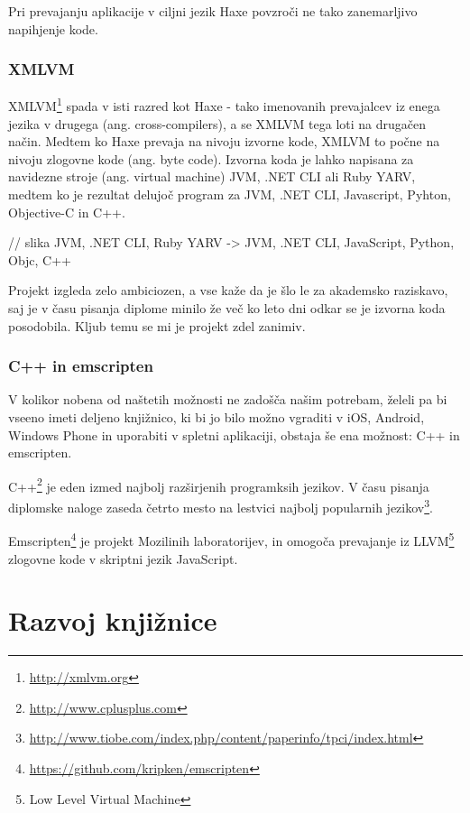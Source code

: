 Pri prevajanju aplikacije v ciljni jezik Haxe povzroči ne tako zanemarljivo napihjenje kode.

\subsection{XMLVM}

XMLVM\footnote{\href{http://xmlvm.org}{http://xmlvm.org}} spada v isti razred kot Haxe - tako imenovanih prevajalcev iz enega jezika v drugega (ang. cross-compilers), a se XMLVM tega loti na drugačen način. Medtem ko Haxe prevaja na nivoju izvorne kode, XMLVM to počne na nivoju zlogovne kode (ang. byte code). Izvorna koda je lahko napisana za navidezne stroje (ang. virtual machine) JVM, .NET CLI ali Ruby YARV, medtem ko je rezultat delujoč program za JVM, .NET CLI, Javascript, Pyhton, Objective-C in C++.

// slika JVM, .NET CLI, Ruby YARV -> JVM, .NET CLI, JavaScript, Python, Objc, C++

Projekt izgleda zelo ambiciozen, a vse kaže da je šlo le za akademsko raziskavo, saj je v času pisanja diplome minilo že več ko leto dni odkar se je izvorna koda posodobila. Kljub temu se mi je projekt zdel zanimiv.

\subsection{C++ in emscripten}

V kolikor nobena od naštetih možnosti ne zadošča našim potrebam, želeli pa bi vseeno imeti deljeno knjižnico, ki bi jo bilo možno vgraditi v iOS, Android, Windows Phone in uporabiti v spletni aplikaciji, obstaja še ena možnost: C++ in emscripten.

C++\footnote{\href{http://www.cplusplus.com}{http://www.cplusplus.com}} je eden izmed najbolj razširjenih programksih jezikov. V času pisanja diplomske naloge zaseda četrto mesto na lestvici najbolj popularnih jezikov\footnote{\href{http://www.tiobe.com/index.php/content/paperinfo/tpci/index.html}{http://www.tiobe.com/index.php/content/paperinfo/tpci/index.html}}.

Emscripten\footnote{\href{https://github.com/kripken/emscripten}{https://github.com/kripken/emscripten}} je projekt Mozilinih laboratorijev, in omogoča prevajanje iz LLVM\footnote{Low Level Virtual Machine} zlogovne kode v skriptni jezik JavaScript.

\chapter{Razvoj knjižnice}
\label{chap:development}

